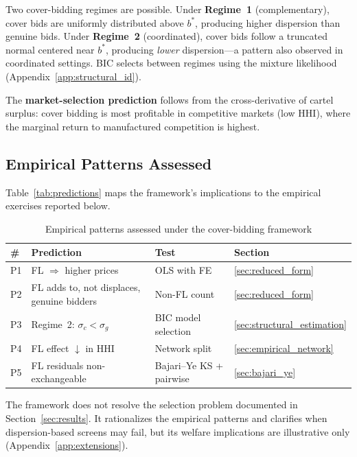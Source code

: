 Two cover-bidding regimes are possible. Under \textbf{Regime~1}
(complementary), cover bids are uniformly distributed above $b^*$,
producing higher dispersion than genuine bids. Under \textbf{Regime~2}
(coordinated), cover bids follow a truncated normal centered near
$b^*$, producing \emph{lower} dispersion---a pattern also observed in
coordinated settings. BIC selects between
regimes using the mixture likelihood (Appendix~\ref{app:structural_id}).

The \textbf{market-selection prediction} follows from the cross-derivative
of cartel surplus: cover bidding is most profitable in competitive
markets (low HHI), where the marginal return to manufactured
competition is highest.

\subsection{Empirical Patterns Assessed}
\label{sec:predictions}

Table~\ref{tab:predictions} maps the framework's implications to the
empirical exercises reported below.

\begin{table}[htbp]
\centering
\caption{Empirical patterns assessed under the cover-bidding framework}
\label{tab:predictions}
\small
\begin{tabular}{llll}
\toprule
\# & Prediction & Test & Section \\
\midrule
P1\label{pred:price_v6} & FL $\Rightarrow$ higher prices & OLS with FE & \ref{sec:reduced_form} \\
P2\label{pred:selection_v6} & FL adds to, not displaces, genuine bidders & Non-FL count & \ref{sec:reduced_form} \\
P3\label{pred:regime_v6} & Regime~2: $\sigma_c < \sigma_g$ & BIC model selection & \ref{sec:structural_estimation} \\
P4\label{pred:market_v6} & FL effect $\downarrow$ in HHI & Network split & \ref{sec:empirical_network} \\
P5\label{pred:exchange_v6} & FL residuals non-exchangeable & Bajari--Ye KS + pairwise & \ref{sec:bajari_ye} \\
\bottomrule
\end{tabular}
\end{table}

\noindent The framework does not resolve the selection problem
documented in Section~\ref{sec:results}. It rationalizes the empirical
patterns and clarifies when dispersion-based screens may fail, but its
welfare implications are illustrative only
(Appendix~\ref{app:extensions}).
